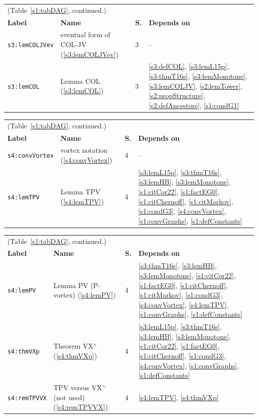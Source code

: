 \begin{center}
{\footnotesize
\setlength{\tabcolsep}{3pt}
\begin{tabular}{p{3.2cm}p{3.6cm}p{0.5cm}p{7.6cm}}
\multicolumn{4}{l}{(Table~\ref{s1:tabDAG}, continued.)}\\
\textbf{Label} & \textbf{Name} & \textbf{S.} & \textbf{Depends on}\\
\hline
\texttt{s3:lemCOLJVev} & eventual form of COL-JV (\ref{s3:lemCOLJVev}) & 3 & --\\
\texttt{s3:lemCOL} & Lemma COL (\ref{s3:lemCOL}) & 3 & \ref{s3:defCOL}, \ref{s3:lemL15p}, \ref{s3:thmT16s}, \ref{s3:lemMonotone}, \ref{s3:lemCOLJV}, \ref{s2:lemTower}, \ref{s2:propStructure}, \ref{s2:defAncestors}, \ref{s1:condG1}\\
\hline
\end{tabular}}
\end{center}

\begin{center}
{\footnotesize
\setlength{\tabcolsep}{3pt}
\begin{tabular}{p{3.2cm}p{3.6cm}p{0.5cm}p{7.6cm}}
\multicolumn{4}{l}{(Table~\ref{s1:tabDAG}, continued.)}\\
\textbf{Label} & \textbf{Name} & \textbf{S.} & \textbf{Depends on}\\
\hline
\texttt{s4:convVortex} & vortex notation (\ref{s4:convVortex}) & 4 & --\\
\texttt{s4:lemTPV} & Lemma TPV (\ref{s4:lemTPV}) & 4 & \ref{s3:lemL15p}, \ref{s3:thmT16s}, \ref{s3:lemHB}, \ref{s3:lemMonotone}, \ref{s1:citCor22}, \ref{s1:factEG0}, \ref{s1:citChernoff}, \ref{s1:citMarkov}, \ref{s1:condG3}, \ref{s4:convVortex}, \ref{s1:convGraphs}, \ref{s1:defConstants}\\
\hline
\end{tabular}}
\end{center}

\begin{center}
{\footnotesize
\setlength{\tabcolsep}{3pt}
\begin{tabular}{p{3.2cm}p{3.6cm}p{0.5cm}p{7.6cm}}
\multicolumn{4}{l}{(Table~\ref{s1:tabDAG}, continued.)}\\
\textbf{Label} & \textbf{Name} & \textbf{S.} & \textbf{Depends on}\\
\hline
\texttt{s4:lemPV} & Lemma PV (P-vortex) (\ref{s4:lemPV}) & 4 & \ref{s3:thmT16s}, \ref{s3:lemHB}, \ref{s3:lemMonotone}, \ref{s1:citCor22}, \ref{s1:factEG0}, \ref{s1:citChernoff}, \ref{s1:citMarkov}, \ref{s1:condG3}, \ref{s4:convVortex}, \ref{s4:lemTPV}, \ref{s1:convGraphs}, \ref{s1:defConstants}\\
\texttt{s4:thmVXp} & Theorem VX$^+$ (\ref{s4:thmVXp}) & 4 & \ref{s3:lemL15p}, \ref{s3:thmT16s}, \ref{s3:lemHB}, \ref{s3:lemMonotone}, \ref{s1:citCor22}, \ref{s1:factEG0}, \ref{s1:citChernoff}, \ref{s1:condG3}, \ref{s4:convVortex}, \ref{s1:convGraphs}, \ref{s1:defConstants}\\
\texttt{s4:remTPVVX} & TPV versus VX$^+$ (not used) (\ref{s4:remTPVVX}) & 4 & \ref{s4:lemTPV}, \ref{s4:thmVXp}\\
\hline
\end{tabular}}
\end{center}

